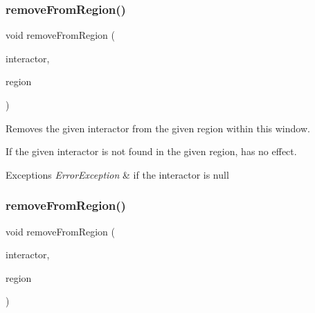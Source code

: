 \mbox{\label{classsgl_1_1GWindow_a87a74b040025878283ba685e30d5104f}} 
\subsubsection{\texorpdfstring{remove\+From\+Region()}{removeFromRegion()}\hspace{0.1cm}{\footnotesize\ttfamily [1/4]}}
{\footnotesize\ttfamily void remove\+From\+Region (\begin{DoxyParamCaption}\item[{\mbox{\hyperlink{classsgl_1_1GInteractor}{G\+Interactor}} $\ast$}]{interactor,  }\item[{\mbox{\hyperlink{classsgl_1_1GWindow_a81a01a86de31071a92e6cce0bab9bc4b}{Region}}}]{region }\end{DoxyParamCaption})\hspace{0.3cm}{\ttfamily [virtual]}}



Removes the given interactor from the given region within this window. 

If the given interactor is not found in the given region, has no effect. 
\begin{DoxyExceptions}{Exceptions}
{\em Error\+Exception} & if the interactor is null \\
\hline
\end{DoxyExceptions}
\mbox{\label{classsgl_1_1GWindow_a16268c8344a5a5d9b10bde95764112d1}} 
\subsubsection{\texorpdfstring{remove\+From\+Region()}{removeFromRegion()}\hspace{0.1cm}{\footnotesize\ttfamily [2/4]}}
{\footnotesize\ttfamily void remove\+From\+Region (\begin{DoxyParamCaption}\item[{\mbox{\hyperlink{classsgl_1_1GInteractor}{G\+Interactor}} $\ast$}]{interactor,  }\item[{const std\+::string \&}]{region }\end{DoxyParamCaption})\hspace{0.3cm}{\ttfamily [virtual]}}



